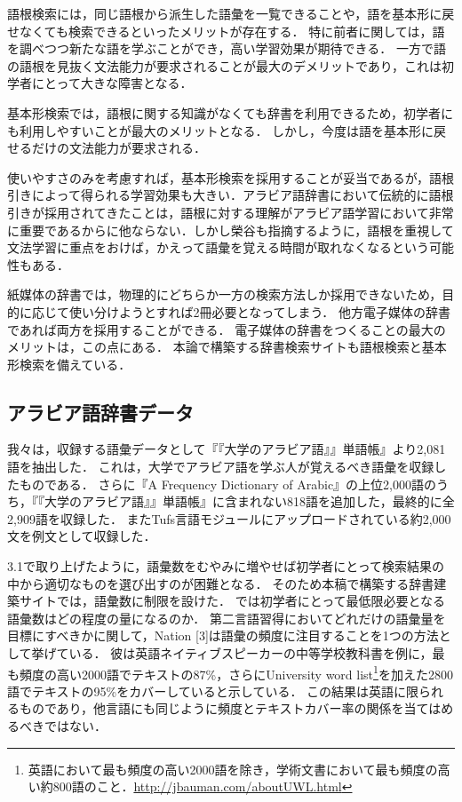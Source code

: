 \documentclass[technicalreport]{ieicej}
\begin{document}
語根検索には，同じ語根から派生した語彙を一覧できることや，語を基本形に戻せなくても検索できるといったメリットが存在する．
特に前者に関しては，語を調べつつ新たな語を学ぶことができ，高い学習効果が期待できる．
一方で語の語根を見抜く文法能力が要求されることが最大のデメリットであり，これは初学者にとって大きな障害となる．

基本形検索では，語根に関する知識がなくても辞書を利用できるため，初学者にも利用しやすいことが最大のメリットとなる．
しかし，今度は語を基本形に戻せるだけの文法能力が要求される．

使いやすさのみを考慮すれば，基本形検索を採用することが妥当であるが，語根引きによって得られる学習効果も大きい．アラビア語辞書において伝統的に語根引きが採用されてきたことは，語根に対する理解がアラビア語学習において非常に重要であるからに他ならない．しかし榮谷\cite{sakaedani2008}も指摘するように，語根を重視して文法学習に重点をおけば，かえって語彙を覚える時間が取れなくなるという可能性もある．

紙媒体の辞書では，物理的にどちらか一方の検索方法しか採用できないため，目的に応じて使い分けようとすれば2冊必要となってしまう．
他方電子媒体の辞書であれば両方を採用することができる．
電子媒体の辞書をつくることの最大のメリットは，この点にある．
本論で構築する辞書検索サイトも語根検索と基本形検索を備えている．

\subsection{アラビア語辞書データ}
我々は，収録する語彙データとして『『大学のアラビア語』』単語帳』\cite{aoyama2015}より2,081語を抽出した．
これは，大学でアラビア語を学ぶ人が覚えるべき語彙を収録したものである．
さらに『A Frequency Dictionary of Arabic』の上位2,000語のうち，『『大学のアラビア語』』単語帳』に含まれない818語を追加した，最終的に全2,909語を収録した．
またTufs言語モジュール\cite{kawaguchi2007}にアップロードされている約2,000文を例文として収録した．

3.1で取り上げたように，語彙数をむやみに増やせば初学者にとって検索結果の中から適切なものを選び出すのが困難となる．
そのため本稿で構築する辞書建築サイトでは，語彙数に制限を設けた．
では初学者にとって最低限必要となる語彙数はどの程度の量になるのか．
第二言語習得においてどれだけの語彙量を目標にすべきかに関して，Nation [3]は語彙の頻度に注目することを1つの方法として挙げている．
彼は英語ネイティブスピーカーの中等学校教科書を例に，最も頻度の高い2000語でテキストの87\%，さらにUniversity word list\footnote{英語において最も頻度の高い2000語を除き，学術文書において最も頻度の高い約800語のこと．\url{http://jbauman.com/aboutUWL.html}}を加えた2800語でテキストの95\%をカバーしていると示している．
この結果は英語に限られるものであり，他言語にも同じように頻度とテキストカバー率の関係を当てはめるべきではない．
\end{document}
